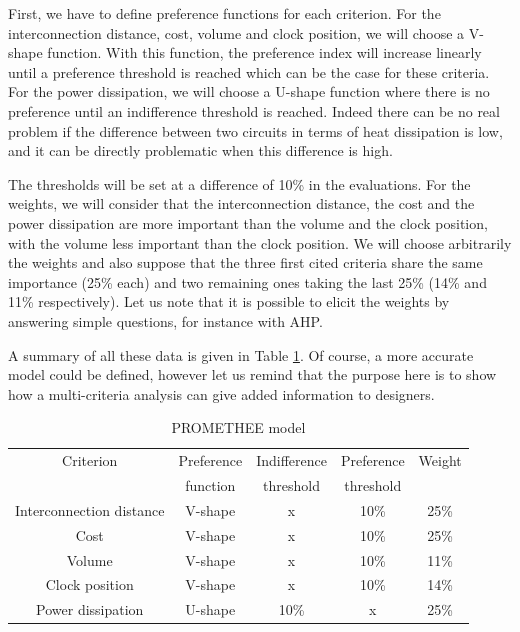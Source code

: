 First, we have to define preference functions for each criterion. For the interconnection distance, cost, volume and clock position, we will choose a V-shape function. With this function, the preference index will increase linearly until a preference threshold is reached which can be the case for these criteria. For the power dissipation, we will choose a U-shape function where there is no preference until an indifference threshold is reached. Indeed there can be no real problem if the difference between two circuits in terms of heat dissipation is low, and it can be directly problematic when this difference is high.

The thresholds will be set at a difference of 10\% in the evaluations. For the weights, we will consider that the interconnection distance, the cost and the power dissipation are more important than the volume and the clock position, with the volume less important than the clock position. We will choose arbitrarily the weights and also suppose that the three first cited criteria share the same importance (25\% each) and two remaining ones taking the last 25\% (14\% and 11\% respectively). Let us note that it is possible to elicit the weights by answering simple questions, for instance with AHP.

A summary of all these data is given in Table \ref{tab:preffunc}. Of course, a more accurate model could be defined, however let us remind that the purpose here is to show how a multi-criteria analysis can give added information to designers.

\begin{table}[h!]
\caption{PROMETHEE model}
\begin{center}
\begin{tabular}{|c|c|c|c|c|}
\hline
Criterion & Preference & Indifference  & Preference & Weight \\
 & function & threshold & threshold & \\
\hline
Interconnection distance & V-shape & x & 10\% & 25\% \\
Cost & V-shape & x & 10\% & 25\% \\
Volume & V-shape & x & 10\% & 11\% \\
Clock position & V-shape & x & 10\% & 14\% \\
Power dissipation & U-shape & 10\% & x & 25\% \\
\hline
\end{tabular}
\end{center}
\label{tab:preffunc}
\end{table}

